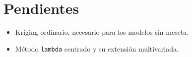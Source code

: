 \documentclass[11pt,a4paper]{article}
\newcommand{\code}[1]{\texttt{#1}}
\begin{document}
\section{Pendientes}

\begin{itemize}
  \item Kriging ordinario, necesario para los modelos sin meseta.
  \item Método \code{lambda} centrado y su extensión multivariada.
\end{itemize}
\end{document}
